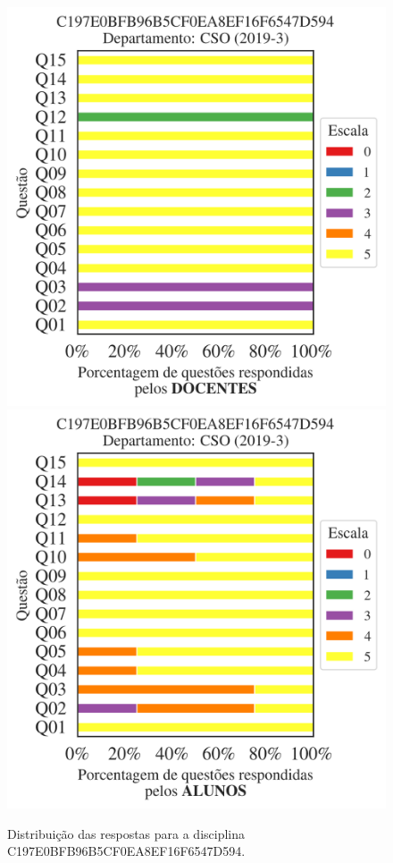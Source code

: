 \documentclass[a4paper,10pt]{article}
\begin{document}
\begin{figure}[h]
\centering
\includegraphics[width=0.485\linewidth]{analise_disciplina_departamento_CSO_C197E0BFB96B5CF0EA8EF16F6547D594_docentes.png}
\includegraphics[width=0.485\linewidth]{analise_disciplina_departamento_CSO_C197E0BFB96B5CF0EA8EF16F6547D594_alunos.png}
\caption{\label{fig:analise_geral_departamento}                Distribuição das respostas para a disciplina C197E0BFB96B5CF0EA8EF16F6547D594. }
\end{figure}
\end{document}

